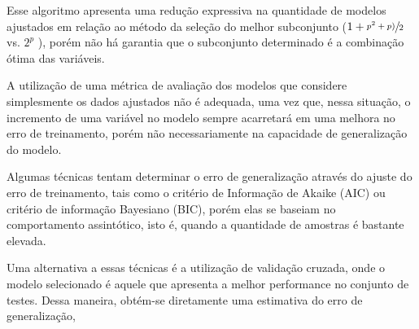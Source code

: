 Esse algoritmo apresenta uma redução expressiva na quantidade de modelos ajustados em relação ao método da 
seleção do melhor subconjunto ($1+\sfrac{p^2+p)}{2}$ vs. $2^p$ ), porém não há
garantia que o subconjunto determinado é a combinação ótima das variáveis. \cite[p. 208]{intro_stat_learn}

A utilização de uma métrica de avaliação dos modelos que considere simplesmente os dados ajustados não é adequada, 
uma vez que, nessa situação, o incremento de uma variável no modelo sempre acarretará em uma melhora no erro de 
treinamento, porém não necessariamente na capacidade de generalização do modelo.

Algumas técnicas tentam determinar o erro de generalização através do ajuste do erro de treinamento, tais como o 
critério de Informação de Akaike (AIC) ou critério de informação Bayesiano (BIC), porém elas se baseiam no 
comportamento assintótico, isto é, quando a quantidade de amostras é bastante elevada.

Uma alternativa a essas técnicas é a utilização de validação cruzada, onde o modelo selecionado é 
aquele que apresenta a melhor performance no conjunto de testes. Dessa maneira, obtém-se diretamente uma 
estimativa do erro de generalização, 